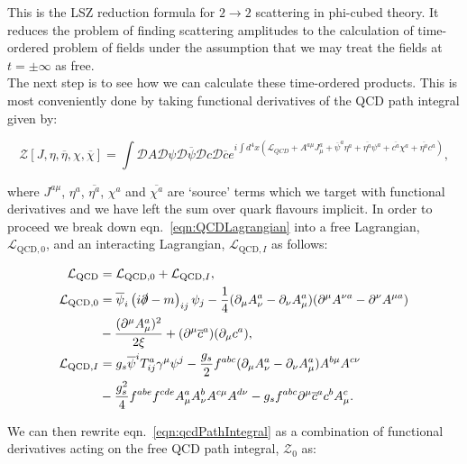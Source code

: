 	This is the LSZ reduction formula for $2\rightarrow2$ scattering in phi-cubed theory.  It reduces the problem of finding scattering
	amplitudes to the calculation of time-ordered problem of fields under the assumption that we may treat the fields at $t=\pm\infty$
	as free.\\The next step is to see how we can calculate these time-ordered products. This is most conveniently done by taking
	functional derivatives of the QCD path integral given by:

	\begin{equation}
		\mathcal{Z}[J, \eta, \overline{\eta}, \chi, \overline{\chi}] = \int\mathcal{D}A\mathcal{D}\psi\mathcal{D}\overline{\psi}
		\mathcal{D}c\mathcal{D}\overline{c} e^{i\int d^4x(\mathcal{L}_{QCD} + A^{a\mu} J_\mu^a + \overline{\psi}^a\eta^a +
		\overline{\eta^a}\psi^a + \overline{c^a}\chi^a + \overline{\eta^a}c^a)},
		\label{eqn:qcdPathIntegral}
	\end{equation}

	where $J^{a\mu}$, $\eta^a$, $\overline{\eta^a}$, $\chi^a$ and $\overline{\chi^a}$ are `source' terms which we target with functional
	derivatives and we have left the sum over quark flavours implicit.  In order to proceed we break down eqn.~\eqref{eqn:QCDLagrangian}
	into a free Lagrangian, $\mathcal{L}_{\text{QCD}, 0}$, and an interacting Lagrangian, $\mathcal{L}_{\text{QCD}, I}$ as follows:

	\begin{align*}
		\mathcal{L}_{\text{QCD}}    &= \mathcal{L}_{\text{QCD}, 0} + \mathcal{L}_{\text{QCD}, I},\\
		\mathcal{L}_{\text{QCD}, 0} &=  \overline{\psi}_i\left(i\slashed \partial-m\right)_{ij}\psi_j -
		\frac{1}{4}(\partial_{\mu}A_{\nu}^a - \partial_{\nu}A_{\mu}^a)(\partial^{\mu}A^{\nu a} - \partial^{\nu}A^{\mu a}) \\
		&-\frac{(\partial^\mu A_\mu^a)^2}{2\xi} + (\partial^\mu \overline{c}^{a})(\partial_\mu c^a),\\
		\mathcal{L}_{\text{QCD}, I} &= g_s\overline{\psi}^i T^a_{ij}\gamma^\mu\psi^j - \frac{g_s}{2}f^{abc}(\partial_{\mu}A^a_{\nu} -
		\partial_{\nu}A^a_{\mu})A^{b\mu}A^{c\nu} \\ &-\frac{g_s^2}{4}f^{abe}f^{cde}A^a_\mu A^b_\nu A^{c\mu}A^{d\nu} -
		g_sf^{abc}\partial^\mu \overline{c}^{a}c^bA^c_\mu.
	\end{align*}

	We can then rewrite eqn.~\eqref{eqn:qcdPathIntegral} as a combination of functional derivatives acting on the free QCD path integral,
	$\mathcal{Z}_0$ as:

